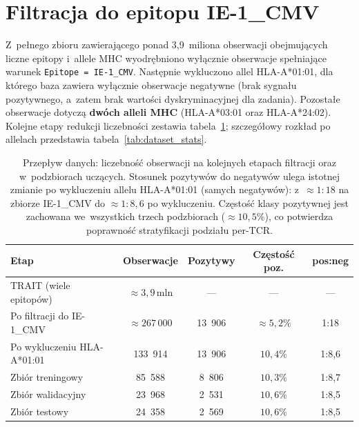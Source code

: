 \documentclass{SGGW-thesis}
\begin{document}
\section{Filtracja do epitopu IE-1\_CMV}

Z~pełnego zbioru zawierającego ponad 3,9~miliona obserwacji obejmujących liczne epitopy i~allele
MHC wyodrębniono wyłącznie obserwacje spełniające warunek \texttt{Epitope = IE-1\_CMV}. Następnie
wykluczono allel HLA-A*01:01, dla którego baza zawiera wyłącznie obserwacje negatywne (brak sygnału
pozytywnego, a~zatem brak wartości dyskryminacyjnej dla zadania). Pozostałe obserwacje dotyczą
\textbf{dwóch alleli MHC} (HLA-A*03:01 oraz HLA-A*24:02). Kolejne etapy redukcji liczebności
zestawia tabela~\ref{tab:dataflow}; szczegółowy rozkład po allelach przedstawia
tabela~\ref{tab:dataset_stats}.

\begin{table}[htbp]
\centering
\small
\caption{Przepływ danych: liczebność obserwacji na kolejnych etapach filtracji oraz w~podzbiorach
uczących. Stosunek pozytywów do negatywów ulega istotnej zmianie po wykluczeniu allelu HLA-A*01:01
(samych negatywów): z~${\approx}1{:}18$ na zbiorze IE-1\_CMV do ${\approx}1{:}8{,}6$ po wykluczeniu.
Częstość klasy pozytywnej jest zachowana we~wszystkich trzech podzbiorach (${\approx}10{,}5\%$),
co potwierdza poprawność stratyfikacji podziału per-TCR.}
\label{tab:dataflow}
\begin{tabular}{lcccc}
\toprule
\textbf{Etap} & \textbf{Obserwacje} & \textbf{Pozytywy} & \textbf{Częstość poz.} & \textbf{pos:neg} \\
\midrule
TRAIT (wiele epitopów)        & ${\approx}3{,}9$\,mln & ---     & ---       & --- \\
Po filtracji do IE-1\_CMV     & ${\approx}267\,000$   & 13~906  & ${\approx}5{,}2\%$  & 1:18 \\
Po wykluczeniu HLA-A*01:01    & 133~914               & 13~906  & $10{,}4\%$ & 1:8,6 \\
\midrule
\quad Zbiór treningowy        & 85~588                & 8~806   & $10{,}3\%$ & 1:8,7 \\
\quad Zbiór walidacyjny       & 23~968                & 2~531   & $10{,}6\%$ & 1:8,5 \\
\quad Zbiór testowy           & 24~358                & 2~569   & $10{,}6\%$ & 1:8,5 \\
\bottomrule
\end{tabular}
\end{table}
\end{document}
